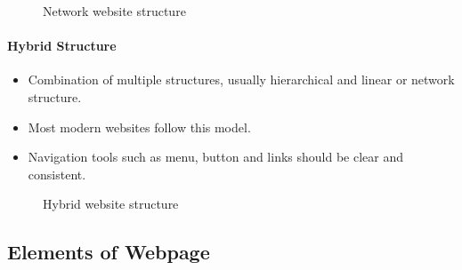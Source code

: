 \begin{figure}[H]
    \centering
    \caption{Network website structure}
    \label{fig:website-structure-network}
\end{figure}

\paragraph{Hybrid Structure}

\begin{itemize}
    \item Combination of multiple structures, usually hierarchical and linear or network structure.
    \item Most modern websites follow this model.
    \item Navigation tools such as menu, button and links should be clear and consistent.
\end{itemize}

\begin{figure}[H]
    \centering
    \caption{Hybrid website structure}
    \label{fig:website-structure-hybrid}
\end{figure}


\subsection{Elements of Webpage}

